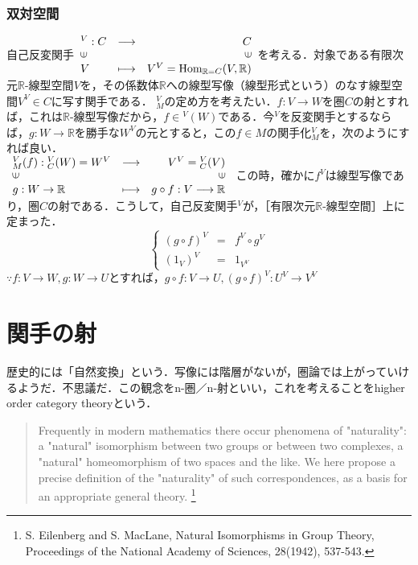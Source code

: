 \documentclass[uplatex, 12pt, a4paper, dvipdfmx]{jsarticle}
\begin{document}
\subsubsection{双対空間}
自己反変関手$\begin{array}{lcr} {}^V:C &\longrightarrow & C\\ \rotatebox{90}{$\in$} & & \rotatebox{90}{$\in$}\\ V&\longmapsto &V^V=\mathrm{Hom}_{\mathbb{R}=C}(V,\mathbb{R}) \end{array}$を考える．対象である有限次元$\mathbb{R}$-線型空間$V$を，その係数体$\mathbb{R}$への線型写像（線型形式という）のなす線型空間$V^V\in C$に写す関手である．
${}^V_M$の定め方を考えたい．$f:V\longrightarrow W$を圏$C$の射とすれば，これは$\mathbb{R}$-線型写像だから，$f\in {}^V(W)$である．今${}^V$を反変関手とするならば，$g:W\longrightarrow\mathbb{R}$を勝手な$W^V$の元とすると，この$f\in M$の関手化${}^V_M$を，次のようにすれば良い．\\$\begin{array}{lcr} {}^V_M(f):{}^V_C(W)=W^V&\longrightarrow &V^V={}^V_C(V) \\ \rotatebox{90}{$\in$} & & \rotatebox{90}{$\in$}\\ g:W\rightarrow\mathbb{R}&\longmapsto & g\circ f:V\longrightarrow\mathbb{R} \end{array}$
この時，確かに$f^V$は線型写像であり，圏$C$の射である．こうして，自己反変関手${}^V$が，［有限次元$\mathbb{R}$-線型空間］上に定まった．
$$\left\{ \begin{array}{lcr} (g\circ f)^V & = & f^V\circ g^V \\ (1_V)^V &=& 1_{V^V}  \end{array} \right.$$
$\because f:V\longrightarrow W, g:W\longrightarrow U $とすれば，$g\circ f:V\longrightarrow U, (g\circ f)^V:U^V\longrightarrow V^V$

\section{関手の射}
歴史的には「自然変換」という．写像には階層がないが，圏論では上がっていけるようだ．不思議だ．この観念をn-圏／n-射といい，これを考えることをhigher order category theoryという．
\begin{quote}Frequently in modern mathematics there occur phenomena of "naturality": a "natural" isomorphism between two groups or between two complexes, a "natural" homeomorphism of two spaces and the like. We here propose a precise definition of the "naturality" of such correspondences, as a basis for an appropriate general theory. \footnote{S. Eilenberg and S. MacLane, Natural Isomorphisms in Group Theory, Proceedings of the National Academy of Sciences, 28(1942), 537-543.}\end{quote}
\end{document}
